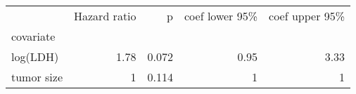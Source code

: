 \begin{tabular}{lrrrr}
\toprule
{} &  Hazard ratio &     p &  coef lower 95\% &  coef upper 95\% \\
covariate  &               &       &                  &                  \\
\midrule
log(LDH)   &          1.78 & 0.072 &             0.95 &             3.33 \\
tumor size &             1 & 0.114 &                1 &                1 \\
\bottomrule
\end{tabular}
